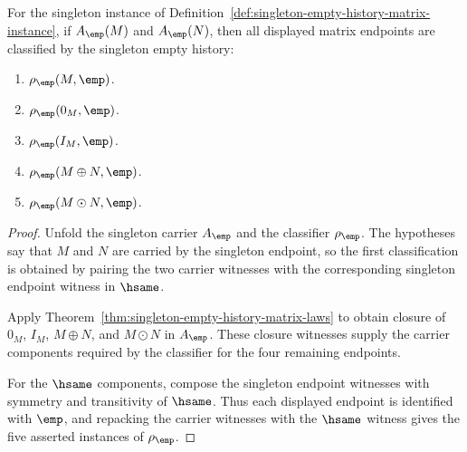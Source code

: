 \begin{theorem}
\label{thm:singleton-empty-history-matrix-endpoint-exactness}
For the singleton instance of
Definition~\ref{def:singleton-empty-history-matrix-instance}, if
$A_{\emp}(M)$ and $A_{\emp}(N)$, then all displayed matrix endpoints are
classified by the singleton empty history:
\begin{enumerate}
  \item $\rho_{\emp}(M,\emp)$.
  \item $\rho_{\emp}(0_M,\emp)$.
  \item $\rho_{\emp}(I_M,\emp)$.
  \item $\rho_{\emp}(M\oplus N,\emp)$.
  \item $\rho_{\emp}(M\odot N,\emp)$.
\end{enumerate}
\end{theorem}
\begin{proof}
Unfold the singleton carrier $A_{\emp}$ and the classifier
$\rho_{\emp}$. The hypotheses say that $M$ and $N$ are carried by the
singleton endpoint, so the first classification is obtained by pairing the
two carrier witnesses with the corresponding singleton endpoint witness in
$\hsame$.

Apply Theorem~\ref{thm:singleton-empty-history-matrix-laws} to obtain closure
of $0_M$, $I_M$, $M\oplus N$, and $M\odot N$ in $A_{\emp}$. These closure
witnesses supply the carrier components required by the classifier for the
four remaining endpoints.

For the $\hsame$ components, compose the singleton endpoint witnesses with
symmetry and transitivity of $\hsame$. Thus each displayed endpoint is
identified with $\emp$, and repacking the carrier witnesses with the
$\hsame$ witness gives the five asserted instances of $\rho_{\emp}$.
\end{proof}


